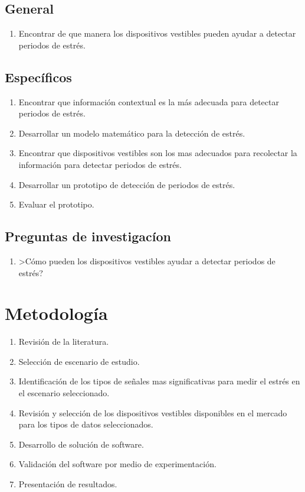\documentclass[letterpaper,12pt]{cicese}
\begin{document}
			\section{General}
				\begin{enumerate}
					\item Encontrar de que manera los dispositivos vestibles pueden ayudar a detectar periodos de estr\'es.
				\end{enumerate}
			\section{Espec\'ificos}
				\begin{enumerate}
					\item Encontrar que informaci\'on contextual es la m\'as adecuada para detectar periodos de estr\'es.
					\item Desarrollar un modelo matem\'atico para la detecci\'on de estr\'es.
					\item Encontrar que dispositivos vestibles son los mas adecuados para recolectar la informaci\'on para detectar periodos de estr\'es.
					\item Desarrollar un prototipo de detecci\'on de periodos de estr\'es.
					\item Evaluar el prototipo.
				\end{enumerate}
			\section{Preguntas de investigac\'ion}
				\begin{enumerate}
					\item >C\'omo pueden los dispositivos vestibles ayudar a detectar periodos de estr\'es?
				\end{enumerate}
		\chapter{Metodolog\'ia}
				\begin{enumerate}
					\item Revisi\'on de la literatura.
					\item Selecci\'on de escenario de estudio.
					\item Identificaci\'on de los tipos de se\~nales mas significativas para medir el estr\'es en el escenario seleccionado.
					\item Revisi\'on y selecci\'on de los dispositivos vestibles disponibles en el mercado para los tipos de datos seleccionados.
					\item Desarrollo de soluci\'on de software.
					\item Validaci\'on del software por medio de experimentaci\'on.
					\item Presentaci\'on de resultados.
				\end{enumerate}
\end{document}

